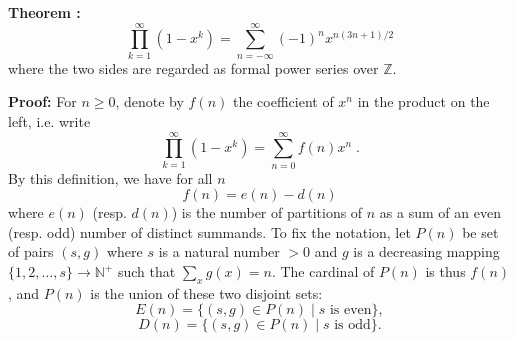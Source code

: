 \documentclass[12pt]{article}
\begin{document}
\newcommand{\Z}{\mathbb{Z}}
\newcommand{\Nplus}{\mathbb{N}^+}
\newcommand{\gbar}{\overline{g}}
\textbf{Theorem :}
\begin{equation} \label{eq:a}
\prod_{k=1}^{\infty}(1-x^k)=\sum_{n=-\infty}^{\infty}(-1)^nx^{n(3n+1)/2}
\end{equation}
where the two sides are regarded as formal power series over $\Z$.

\textbf{Proof: }For $n\ge 0$, denote by $f(n)$ the coefficient of
$x^n$ in the product on the left, i.e. write
$$\prod_{k=1}^{\infty}(1-x^k)=\sum_{n=0}^{\infty}f(n)x^n\;.$$
By this definition, we have for all $n$
$$f(n)=e(n)-d(n)$$
where $e(n)$ (resp. $d(n)$) is the number of partitions of $n$ as
a sum of an even (resp. odd) number of distinct summands.
To fix the notation, let $P(n)$ be set of pairs $(s,g)$ where $s$ is
a natural number $>0$ and $g$ is a decreasing mapping
$\{1,2,\ldots,s\}\to\Nplus$ such that $\sum_xg(x)=n$.
The cardinal of $P(n)$ is thus $f(n)$, and $P(n)$ is the union of
these two disjoint sets:
$$E(n)=\{(s,g)\in P(n)\mid s\text{ is even}\},$$
$$D(n)=\{(s,g)\in P(n)\mid s\text{ is odd}\}.$$
\end{document}
